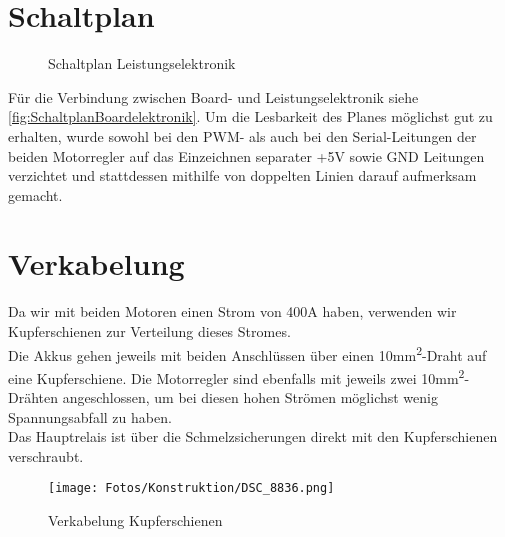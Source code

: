 \section{Schaltplan}
\begin{figure}[H]
    
    \caption{Schaltplan Leistungselektronik\label{fig:schaltLeistung}}
\end{figure}
Für die Verbindung zwischen Board- und Leistungselektronik siehe \autoref{fig:SchaltplanBoardelektronik}.
Um die Lesbarkeit des Planes möglichst gut zu erhalten, wurde sowohl bei den PWM- als auch bei den Serial-Leitungen der beiden Motorregler auf das Einzeichnen separater +5V sowie GND Leitungen verzichtet und stattdessen mithilfe von doppelten Linien darauf aufmerksam gemacht.

\clearpage
\section{Verkabelung}
Da wir mit beiden Motoren einen Strom von 400A haben, verwenden wir Kupferschienen zur Verteilung dieses Stromes.\\
Die Akkus gehen jeweils mit beiden Anschlüssen über einen 10mm\textsuperscript{2}-Draht auf eine Kupferschiene. Die Motorregler sind ebenfalls mit jeweils zwei 10mm\textsuperscript{2}-Drähten angeschlossen, um bei diesen hohen Strömen möglichst wenig Spannungsabfall zu haben.\\
Das Hauptrelais ist über die Schmelzsicherungen direkt mit den Kupferschienen verschraubt.
\begin{figure}[H]
    \texttt{[image: Fotos/Konstruktion/DSC\_8836.png]}
    \caption{Verkabelung Kupferschienen}
\end{figure}


\clearpage